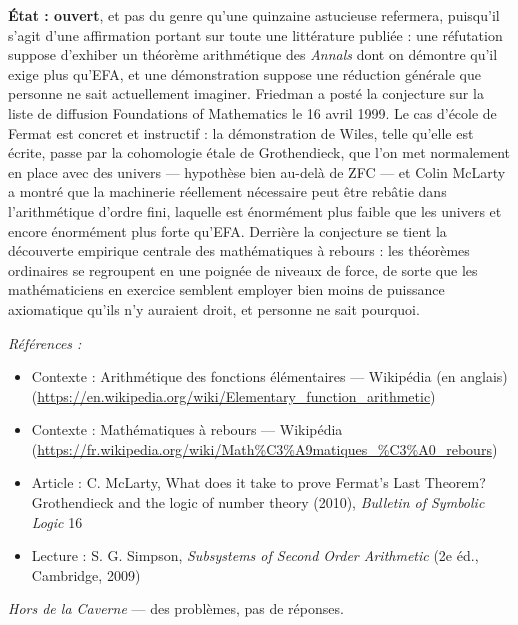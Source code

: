 \documentclass[11pt]{article}
\newenvironment{refs}{\par\small\noindent\emph{Références :}\begin{itemize}\setlength\itemsep{0pt}}{\end{itemize}\normalsize}
\begin{document}
\noindent \textbf{État : ouvert}, et pas du genre qu'une quinzaine astucieuse
refermera, puisqu'il s'agit d'une affirmation portant sur toute une littérature publiée : une
réfutation suppose d'exhiber un théorème arithmétique des \textit{Annals} dont on démontre
qu'il exige plus qu'EFA, et une démonstration suppose une réduction générale que personne ne
sait actuellement imaginer. Friedman a posté la conjecture sur la liste de diffusion
Foundations of Mathematics le 16 avril 1999. Le cas d'école de Fermat est concret et
instructif : la démonstration de Wiles, telle qu'elle est écrite, passe par la cohomologie
étale de Grothendieck, que l'on met normalement en place avec des univers --- hypothèse bien
au-delà de ZFC --- et Colin McLarty a montré que la machinerie réellement nécessaire peut être
rebâtie dans l'arithmétique d'ordre fini, laquelle est énormément plus faible que les univers
et encore énormément plus forte qu'EFA. Derrière la conjecture se tient la découverte
empirique centrale des mathématiques à rebours : les théorèmes ordinaires se regroupent en une
poignée de niveaux de force, de sorte que les mathématiciens en exercice semblent employer
bien moins de puissance axiomatique qu'ils n'y auraient droit, et personne ne sait
pourquoi.

\begin{refs}
\item Contexte : Arithmétique des fonctions élémentaires --- Wikipédia (en anglais) (\url{https://en.wikipedia.org/wiki/Elementary_function_arithmetic})
\item Contexte : Mathématiques à rebours --- Wikipédia (\url{https://fr.wikipedia.org/wiki/Math%C3%A9matiques_%C3%A0_rebours})
\item Article : C. McLarty, \og{} What does it take to prove Fermat's Last Theorem? Grothendieck and the logic of number theory \fg{} (2010), \textit{Bulletin of Symbolic Logic} 16
\item Lecture : S. G. Simpson, \textit{Subsystems of Second Order Arithmetic} (2e éd., Cambridge, 2009)
\end{refs}

\bigskip


\vfill
\noindent\emph{Hors de la Caverne} --- des probl\`emes, pas de r\'eponses.
\end{document}
